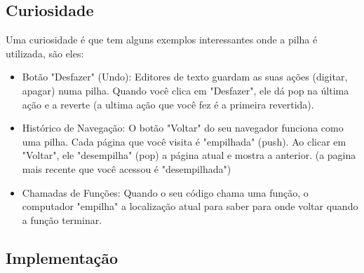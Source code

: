 \documentclass{report}
\begin{document}
	
	\subsection{Curiosidade}
	
	Uma curiosidade é que tem alguns exemplos interessantes onde a pilha é utilizada, são eles:
	
	\begin{itemize}
		\item Botão "Desfazer" (Undo): Editores de texto guardam as suas ações (digitar, apagar) numa pilha. Quando você clica em "Desfazer", ele dá pop na última ação e a reverte (a ultima ação que você fez é a primeira revertida).
		\item Histórico de Navegação: O botão "Voltar" do seu navegador funciona como uma pilha. Cada página que você visita é "empilhada" (push). Ao clicar em "Voltar", ele "desempilha" (pop) a página atual e mostra a anterior. (a pagina mais recente que você acessou é "desempilhada")
		\item Chamadas de Funções: Quando o seu código chama uma função, o computador "empilha" a localização atual para saber para onde voltar quando a função terminar.
	\end{itemize}
	
	
	
	\subsection{Implementação}
	
\end{document}
